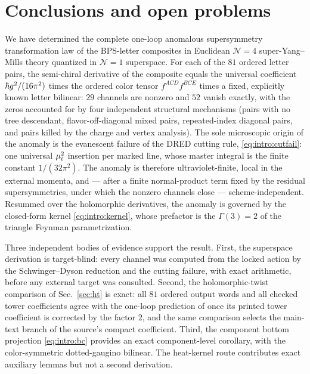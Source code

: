 \section{Conclusions and open problems}\label{sec:conclusion}

We have determined the complete one-loop anomalous supersymmetry transformation law of the BPS-letter composites in
Euclidean $\mathcal N=4$ super-Yang--Mills theory quantized in $\mathcal N=1$ superspace. For each of the $81$ ordered
letter pairs, the semi-chiral derivative of the composite equals the universal coefficient $\hbar g^2/(16\pi^2)$ times the
ordered color tensor $f^{ACD}f^{BCE}$ times a fixed, explicitly known letter bilinear: $29$ channels are nonzero and $52$
vanish exactly, with the zeros accounted for by four independent structural mechanisms (pairs with no tree descendant,
flavor-off-diagonal mixed pairs, repeated-index diagonal pairs, and pairs killed by the charge and vertex analysis). The
sole microscopic origin of the anomaly is the evanescent failure of the DRED cutting rule, \eqref{eq:intro:cutfail}: one
universal $\mu_\ell^2$ insertion per marked line, whose master integral is the finite constant $1/(32\pi^2)$. The anomaly is
therefore ultraviolet-finite, local in the external momenta, and --- after a finite normal-product term fixed by the
residual supersymmetries, under which the nonzero channels close --- scheme-independent. Resummed over the holomorphic
derivatives, the anomaly is governed by the closed-form kernel \eqref{eq:intro:kernel}, whose prefactor is the
$\Gamma(3)=2$ of the triangle Feynman parametrization.

Three independent bodies of evidence support the result. First, the superspace derivation is target-blind: every channel
was computed from the locked action by the Schwinger--Dyson reduction and the cutting failure, with exact arithmetic,
before any external target was consulted. Second, the holomorphic-twist comparison of Sec.~\ref{sec:ht} is exact: all
$81$ ordered output words and all checked tower coefficients agree with the one-loop prediction of \cite{BK} once its
printed tower coefficient is corrected by the factor $2$, and the same comparison selects the main-text branch of the
source's compact coefficient. Third, the component bottom projection \eqref{eq:intro:bc} provides an exact
component-level corollary, with the color-symmetric dotted-gaugino bilinear. The heat-kernel route contributes exact
auxiliary lemmas but not a second derivation.

